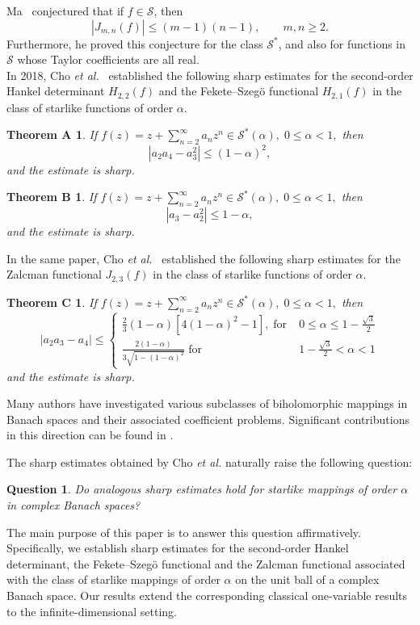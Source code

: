 \documentclass[11pt, reqno]{amsart}
\newtheorem{ques}{Question}[section]
\newtheorem*{theoA}{Theorem A}
\newtheorem*{theoB}{Theorem B}
\newtheorem*{theoC}{Theorem C}
\numberwithin{equation}{section}
\begin{document}
Ma~\cite{M1999} conjectured that if \(f\in\mathcal{S}\), then
\[
|J_{m,n}(f)|\le (m-1)(n-1), \qquad m,n\ge2.
\]
Furthermore, he proved this conjecture for the class \(\mathcal{S}^{*}\), and also for functions in \(\mathcal{S}\) whose Taylor coefficients are all real.\\



\medskip
In 2018, Cho \emph{et al.}~\cite{CKKLS2018} established the following sharp estimates for the second-order Hankel determinant $H_{2,2}(f)$ and the Fekete--Szeg\"o functional $H_{2,1}(f)$ in the class of starlike functions of order $\alpha$.

\begin{theoA}\cite[Theorem 2.3]{CKKLS2018}
If $f(z)=z+\sum_{n=2}^{\infty}a_nz^n
\in\mathcal{S}^*(\alpha),
\;0\leq \alpha<1,$
then
\[
|a_2a_4-a_3^2|\le (1-\alpha)^2,
\]
and the estimate is sharp.
\end{theoA}

\begin{theoB}\cite[Theorem 2.5]{CKKLS2018}
If $f(z)=z+\sum_{n=2}^{\infty}a_nz^n
\in\mathcal{S}^*(\alpha),
\;0\leq \alpha<1,$
then
\[
|a_3-a_2^2|\le 1-\alpha,
\]
and the estimate is sharp.
\end{theoB}
In the same paper, Cho \emph{et al.}~\cite{CKKLS2018} established the following sharp estimates for the Zalcman functional $J_{2,3}(f)$ in the class of starlike functions of order $\alpha$.
\begin{theoC}\cite[Theorem 2.1]{CKKLS2018}
If $f(z)=z+\sum_{n=2}^{\infty}a_nz^n
\in\mathcal{S}^*(\alpha),
\;0\leq \alpha<1,$
then
\[
|a_2a_3-a_4|\le \begin{cases} \frac{2}{3}(1-\alpha)[4(1-\alpha)^2-1], \;\text{for}\; & 0\leq \alpha\leq  1-\frac{\sqrt 3}{2}\\
         \frac{2(1-\alpha)}{3\sqrt{1-(1-\alpha)^2}} \;\text{for}\; &  1-\frac{\sqrt 3}{2}<\alpha <1
\end{cases}
\]
and the estimate is sharp.
\end{theoC}
Many authors have investigated various subclasses of biholomorphic mappings in Banach spaces and their associated coefficient problems. Significant contributions in this direction can be found in \cite{HKK2021,HKL2001,H2023,Kohr1998,Suffridge1973,XDL2026,XHX2025}.

\medskip


The sharp estimates obtained by Cho \emph{et al.} \cite{CKKLS2018} naturally raise the following question: 
\begin{ques} Do analogous sharp estimates hold for starlike mappings of order $\alpha$ in complex Banach spaces? 
\end{ques} 
The main purpose of this paper is to answer this question affirmatively. Specifically, we establish sharp estimates for the second-order Hankel determinant, the Fekete--Szeg\"o functional and the Zalcman functional associated with the class of starlike mappings of order $\alpha$ on the unit ball of a complex Banach space. Our results extend the corresponding classical one-variable results to the infinite-dimensional setting.
\end{document}
